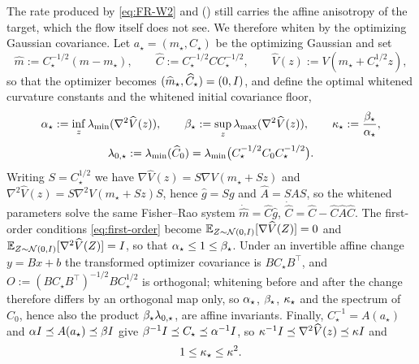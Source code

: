 The rate produced by \eqref{eq:FR-W2} and  () still carries the affine
anisotropy of the target, which the flow itself does not see. We therefore whiten by the
optimizing Gaussian covariance. Let $a_\star=(m_\star,C_\star)$ be the optimizing Gaussian and
set
\begin{equation}\label{eq:whitening}
    \widehat m:=C_\star^{-1/2}(m-m_\star),
    \qquad
    \widehat C:=C_\star^{-1/2}CC_\star^{-1/2},
    \qquad
    \widehat V(z):=V(m_\star+C_\star^{1/2}z),
\end{equation}
so that the optimizer becomes $(\widehat m_\star,\widehat C_\star)=(0,I)$, and define the
optimal whitened curvature constants and the whitened initial covariance floor,
\begin{equation}\label{eq:star-curvature}
    \alpha_\star:=\inf_{z}\lambda_{\min}(\nabla^2\widehat V(z)),
    \qquad
    \beta_\star:=\sup_{z}\lambda_{\max}(\nabla^2\widehat V(z)),
    \qquad
    \kappa_\star:=\frac{\beta_\star}{\alpha_\star},
\end{equation}
\begin{equation}\label{eq:lamzstar}
    \lambda_{0,\star}:=\lambda_{\min}(\widehat C_0)
    =\lambda_{\min}\bigl(C_\star^{-1/2}C_0C_\star^{-1/2}\bigr).
\end{equation}
Writing $S=C_\star^{1/2}$ we have $\nabla\widehat V(z)=S\nabla V(m_\star+Sz)$ and
$\nabla^2\widehat V(z)=S\nabla^2V(m_\star+Sz)S$, hence $\widehat g=Sg$ and
$\widehat A=SAS$, so the whitened parameters solve the same Fisher--Rao system
$\dot{\widehat m}=\widehat C\widehat g$,
$\dot{\widehat C}=\widehat C-\widehat C\widehat A\widehat C$. The first-order conditions
\eqref{eq:first-order} become
$\mathbb{E}_{Z\sim\mathcal{N}(0,I)}[\nabla\widehat V(Z)]=0$ and
$\mathbb{E}_{Z\sim\mathcal{N}(0,I)}[\nabla^2\widehat V(Z)]=I$, so that
$\alpha_\star\leq1\leq\beta_\star$. Under an invertible affine change $y=Bx+b$ the transformed
optimizer covariance is $BC_\star B^\top$, and
$O:=(BC_\star B^\top)^{-1/2}BC_\star^{1/2}$ is orthogonal; whitening before and after the
change therefore differs by an orthogonal map only, so $\alpha_\star$, $\beta_\star$,
$\kappa_\star$ and the spectrum of $\widehat C_0$, hence also the product
$\beta_\star\lambda_{0,\star}$, are affine invariants. Finally, $C_\star^{-1}=A(a_\star)$ and
$\alpha I\preceq A(a_\star)\preceq\beta I$ give
$\beta^{-1}I\preceq C_\star\preceq\alpha^{-1}I$, so
$\kappa^{-1}I\preceq\nabla^2\widehat V(z)\preceq\kappa I$ and
\begin{equation}\label{eq:kappa-star-kappa}
    1\leq\kappa_\star\leq\kappa^2 .
\end{equation}

